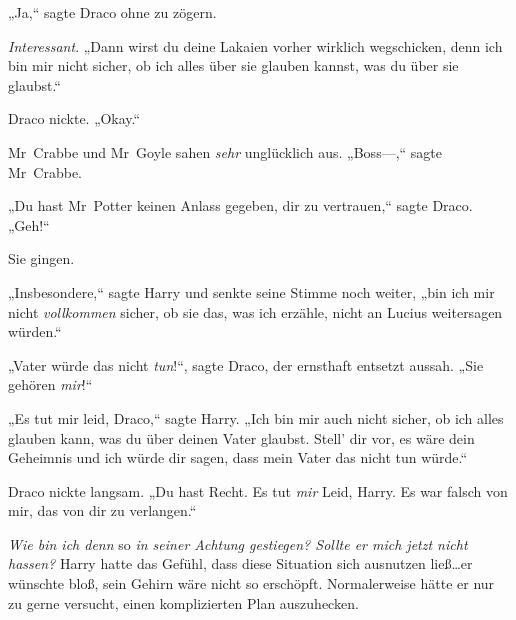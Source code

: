 „Ja,“ sagte Draco ohne zu zögern.

\emph{Interessant}. „Dann wirst du deine Lakaien vorher wirklich wegschicken, denn ich bin mir nicht sicher, ob ich alles über sie glauben kannst, was du über sie glaubst.“

Draco nickte. „Okay.“

Mr~Crabbe und Mr~Goyle sahen \emph{sehr} unglücklich aus. „Boss—,“ sagte Mr~Crabbe.

„Du hast Mr~Potter keinen Anlass gegeben, dir zu vertrauen,“ sagte Draco. „Geh!“

Sie gingen.

„Insbesondere,“ sagte Harry und senkte seine Stimme noch weiter, „bin ich mir nicht \emph{vollkommen} sicher, ob sie das, was ich erzähle, nicht an Lucius weitersagen würden.“

„Vater würde das nicht \emph{tun}!“, sagte Draco, der ernsthaft entsetzt aussah. „Sie gehören \emph{mir}!“

„Es tut mir leid, Draco,“ sagte Harry. „Ich bin mir auch nicht sicher, ob ich alles glauben kann, was du über deinen Vater glaubst. Stell’ dir vor, es wäre dein Geheimnis und ich würde dir sagen, dass mein Vater das nicht tun würde.“

Draco nickte langsam. „Du hast Recht. Es tut \emph{mir} Leid, Harry. Es war falsch von mir, das von dir zu verlangen.“

\emph{Wie bin ich denn} so \emph{in seiner Achtung gestiegen? Sollte er mich jetzt nicht hassen?} Harry hatte das Gefühl, dass diese Situation sich ausnutzen ließ…er wünschte bloß, sein Gehirn wäre nicht so erschöpft. Normalerweise hätte er nur zu gerne versucht, einen komplizierten Plan auszuhecken.

